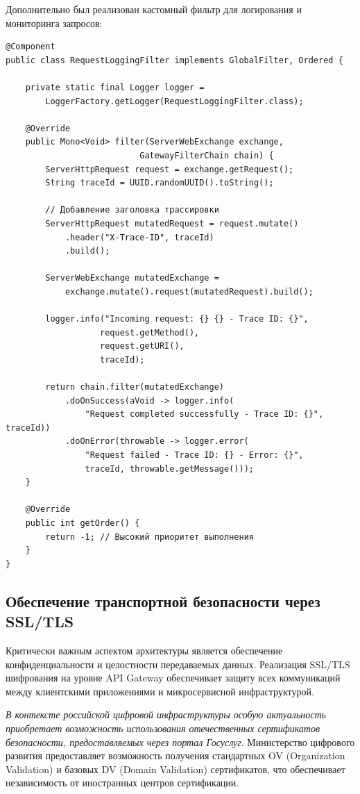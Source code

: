 Дополнительно был реализован кастомный фильтр для логирования и мониторинга запросов:

\begin{lstlisting}
@Component
public class RequestLoggingFilter implements GlobalFilter, Ordered {

    private static final Logger logger =
        LoggerFactory.getLogger(RequestLoggingFilter.class);

    @Override
    public Mono<Void> filter(ServerWebExchange exchange,
                           GatewayFilterChain chain) {
        ServerHttpRequest request = exchange.getRequest();
        String traceId = UUID.randomUUID().toString();

        // Добавление заголовка трассировки
        ServerHttpRequest mutatedRequest = request.mutate()
            .header("X-Trace-ID", traceId)
            .build();

        ServerWebExchange mutatedExchange =
            exchange.mutate().request(mutatedRequest).build();

        logger.info("Incoming request: {} {} - Trace ID: {}",
                   request.getMethod(),
                   request.getURI(),
                   traceId);

        return chain.filter(mutatedExchange)
            .doOnSuccess(aVoid -> logger.info(
                "Request completed successfully - Trace ID: {}", traceId))
            .doOnError(throwable -> logger.error(
                "Request failed - Trace ID: {} - Error: {}",
                traceId, throwable.getMessage()));
    }

    @Override
    public int getOrder() {
        return -1; // Высокий приоритет выполнения
    }
}
\end{lstlisting}

\subsection{Обеспечение транспортной безопасности через SSL/TLS}

Критически важным аспектом архитектуры является обеспечение конфиденциальности и целостности передаваемых данных. Реализация SSL/TLS шифрования на уровне API Gateway обеспечивает защиту всех коммуникаций между клиентскими приложениями и микросервисной инфраструктурой.

\textit{В контексте российской цифровой инфраструктуры особую актуальность приобретает возможность использования отечественных сертификатов безопасности, предоставляемых через портал Госуслуг}. Министерство цифрового развития предоставляет возможность получения стандартных OV (Organization Validation) и базовых DV (Domain Validation) сертификатов, что обеспечивает независимость от иностранных центров сертификации.

